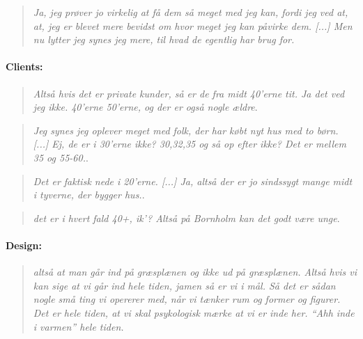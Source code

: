 \begin{quote}
	\textit{Ja, jeg prøver jo virkelig at få dem så meget med jeg kan, fordi jeg ved at, at, jeg er blevet mere bevidst om hvor meget jeg kan påvirke dem. [...] Men nu lytter jeg synes jeg mere, til hvad de egentlig har brug for. }\label{quote:expertProcess3Danish}\\
\end{quote}

\paragraph*{Clients:}
\begin{quote}
	\textit{Altså hvis det er private kunder, så er de fra midt 40’erne tit. Ja det ved jeg ikke. 40’erne 50’erne, og der er også nogle ældre}\label{quote:expertClients1Danish}.\\
\end{quote}

\begin{quote}
	\textit{Jeg synes jeg oplever meget med folk, der har købt nyt hus med to børn. [...] Ej, de er i 30’erne ikke? 30,32,35 og så op efter ikke? Det er mellem 35 og 55-60.}\label{quote:expertClients2Danish}.\\
\end{quote}

\begin{quote}
	\textit{Det er faktisk nede i 20’erne. [...] Ja, altså der er jo sindssygt mange midt i tyverne, der bygger hus.}\label{quote:expertClients3Danish}.\\
\end{quote}

\begin{quote}
	\textit{det er i hvert fald 40+, ik’? Altså på Bornholm kan det godt være unge}\label{quote:expertClients4Danish}.\\
\end{quote}

\paragraph*{Design:}
\begin{quote}
	\textit{altså at man går ind på græsplænen og ikke ud på græsplænen. Altså hvis vi kan sige at vi går ind hele tiden, jamen så er vi i mål. Så det er sådan nogle små ting vi opererer med, når vi tænker rum og former og figurer. Det er hele tiden, at vi skal psykologisk mærke at vi er inde her. “Ahh inde i varmen” hele tiden.}\label{quote:expertDesign1Danish}\\
\end{quote}

